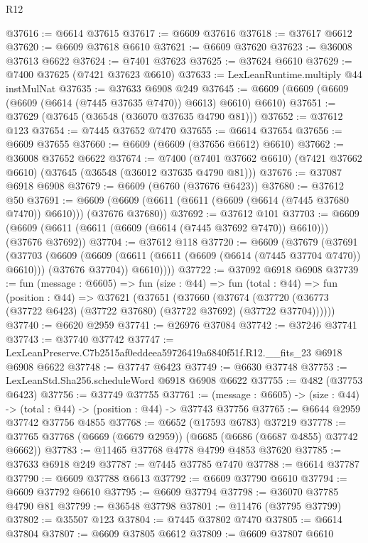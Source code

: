 \begin{lexlean}{R12}
\begin{coremodule}
@37616 := @6614 @37615
@37617 := @6609 @37616
@37618 := @37617 @6612
@37620 := @6609 @37618 @6610
@37621 := @6609 @37620
@37623 := @36008 @37613 @6622
@37624 := @7401 @37623
@37625 := @37624 @6610
@37629 := @7400 @37625 (@7421 @37623 @6610)
@37633 := LexLeanRuntime.multiply @44 instMulNat
@37635 := @37633 @6908 @249
@37645 := @6609 (@6609 (@6609 (@6609 (@6614 (@7445 @37635 @7470)) @6613) @6610) @6610)
@37651 := @37629 (@37645 (@36548 (@36070 @37635 @4790 @81)))
@37652 := @37612 @123
@37654 := @7445 @37652 @7470
@37655 := @6614 @37654
@37656 := @6609 @37655
@37660 := @6609 (@6609 (@37656 @6612) @6610)
@37662 := @36008 @37652 @6622
@37674 := @7400
    (@7401 @37662 @6610)
    (@7421 @37662 @6610)
    (@37645 (@36548 (@36012 @37635 @4790 @81)))
@37676 := @37087 @6918 @6908
@37679 := @6609 (@6760 (@37676 @6423))
@37680 := @37612 @50
@37691 := @6609 (@6609 (@6611 (@6611 (@6609 (@6614 (@7445 @37680 @7470)) @6610))) (@37676 @37680))
@37692 := @37612 @101
@37703 := @6609 (@6609 (@6611 (@6611 (@6609 (@6614 (@7445 @37692 @7470)) @6610))) (@37676 @37692))
@37704 := @37612 @118
@37720 := @6609
    (@37679
      (@37691
        (@37703
          (@6609
            (@6609 (@6611 (@6611 (@6609 (@6614 (@7445 @37704 @7470)) @6610))) (@37676 @37704))
            @6610))))
@37722 := @37092 @6918 @6908
@37739 := fun (message : @6605) =>
  fun (size : @44) =>
  fun (total : @44) =>
  fun (position : @44) =>
  @37621
    (@37651
      (@37660
        (@37674 (@37720 (@36773 (@37722 @6423) (@37722 @37680) (@37722 @37692) (@37722 @37704))))))
@37740 := @6620 @2959
@37741 := @26976 @37084
@37742 := @37246 @37741
@37743 := @37740 @37742
@37747 := LexLeanPreserve.C7b2515af0eddeea59726419a6840f51f.R12.__fits_23 @6918 @6908 @6622
@37748 := @37747 @6423
@37749 := @6630 @37748
@37753 := LexLeanStd.Sha256.scheduleWord @6918 @6908 @6622
@37755 := @482 (@37753 @6423)
@37756 := @37749 @37755
@37761 := (message : @6605) -> (size : @44) -> (total : @44) -> (position : @44) -> @37743 @37756
@37765 := @6644 @2959 @37742 @37756 @4855
@37768 := @6652 (@17593 @6783) @37219
@37778 := @37765 @37768 (@6669 (@6679 @2959)) (@6685 (@6686 (@6687 @4855) @37742 @6662))
@37783 := @11465 @37768 @4778 @4799 @4853 @37620
@37785 := @37633 @6918 @249
@37787 := @7445 @37785 @7470
@37788 := @6614 @37787
@37790 := @6609 @37788 @6613
@37792 := @6609 @37790 @6610
@37794 := @6609 @37792 @6610
@37795 := @6609 @37794
@37798 := @36070 @37785 @4790 @81
@37799 := @36548 @37798
@37801 := @11476 (@37795 @37799)
@37802 := @35507 @123
@37804 := @7445 @37802 @7470
@37805 := @6614 @37804
@37807 := @6609 @37805 @6612
@37809 := @6609 @37807 @6610

\end{coremodule}
\end{lexlean}
